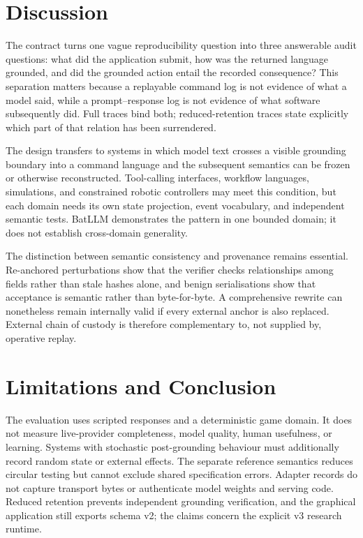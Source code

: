 \documentclass[conference,a4paper]{IEEEtran}
\begin{document}
\section{Discussion}
The contract turns one vague reproducibility question into three answerable audit questions: what did the application submit, how was the returned language grounded, and did the grounded action entail the recorded consequence? This separation matters because a replayable command log is not evidence of what a model said, while a prompt--response log is not evidence of what software subsequently did. Full traces bind both; reduced-retention traces state explicitly which part of that relation has been surrendered.

The design transfers to systems in which model text crosses a visible grounding boundary into a command language and the subsequent semantics can be frozen or otherwise reconstructed. Tool-calling interfaces, workflow languages, simulations, and constrained robotic controllers may meet this condition, but each domain needs its own state projection, event vocabulary, and independent semantic tests. BatLLM demonstrates the pattern in one bounded domain; it does not establish cross-domain generality.

The distinction between semantic consistency and provenance remains essential. Re-anchored perturbations show that the verifier checks relationships among fields rather than stale hashes alone, and benign serialisations show that acceptance is semantic rather than byte-for-byte. A comprehensive rewrite can nonetheless remain internally valid if every external anchor is also replaced. External chain of custody is therefore complementary to, not supplied by, operative replay.

\section{Limitations and Conclusion}
The evaluation uses scripted responses and a deterministic game domain. It does not measure live-provider completeness, model quality, human usefulness, or learning. Systems with stochastic post-grounding behaviour must additionally record random state or external effects. The separate reference semantics reduces circular testing but cannot exclude shared specification errors. Adapter records do not capture transport bytes or authenticate model weights and serving code. Reduced retention prevents independent grounding verification, and the graphical application still exports schema v2; the claims concern the explicit v3 research runtime.
\end{document}
